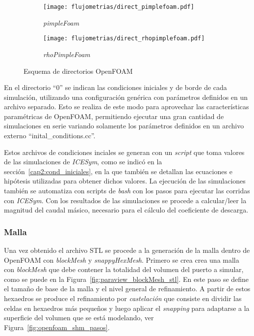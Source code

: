 \begin{figure}[ht!]
  \centering
  \begin{subfigure}[b]{0.4\textwidth}
    \centering
    \texttt{[image: flujometrias/direct\_pimplefoam.pdf]}
    \caption{\emph{pimpleFoam}\label{fig:direc_pf} }
  \end{subfigure}%
  \begin{subfigure}[b]{0.4\textwidth}
    \centering
    \texttt{[image: flujometrias/direct\_rhopimplefoam.pdf]}
    \caption{\emph{rhoPimpleFoam}\label{fig:direc_rpf} }
  \end{subfigure}
  \caption{Esquema de directorios OpenFOAM}
\end{figure}


En el directorio ``0'' se indican las condiciones iniciales y de borde de cada
simulación, utilizando una configuración genérica con parámetros definidos en un
archivo separado.
%
Esto se realiza de este modo para aprovechar las características paramétricas de
OpenFOAM, permitiendo ejecutar una gran cantidad de simulaciones en serie
variando solamente los parámetros definidos en un archivo externo
``inital\_conditions.cc''.

Estos archivos de condiciones inciales se generan con un \emph{script} que toma
valores de las simulaciones de \emph{ICESym}, como se indicó en la
sección~\ref{cap2:cond_iniciales}, en la que también se detallan las ecuaciones
e hipótesis utilizadas para obtener dichos valores.
%
La ejecución de las simulaciones también se automatiza con scripts de
\emph{bash} con los pasos para ejecutar las corridas con \emph{ICESym}.
%
Con los resultados de las simulaciones se procede a calcular/leer la magnitud
del caudal másico, necesario para el cálculo del coeficiente de descarga.


\subsubsection{Malla}\label{sec:cap3_of_malla}
%
Una vez obtenido el archivo STL se procede a la generación de la malla dentro de
OpenFOAM con \emph{blockMesh} y \emph{snappyHexMesh}.
%
Primero se crea crea una malla con \emph{blockMesh} que  debe contener la
totalidad del volumen del puerto a simular, como se puede en la
Figura~\ref{fig:paraview_blockMesh_stl}.
%
En este paso se define el tamaño de base de la malla y el nivel general de
refinamiento.
%
A partir de estos hexaedros se produce el refinamiento por \emph{castelación}
que consiste en dividir las celdas en hexaedros más pequeños y luego aplicar el
\emph{snapping} para adaptarse a la superficie del volumen que se está
modelando, ver Figura~\ref{fig:openfoam_shm_pasos}.
%

